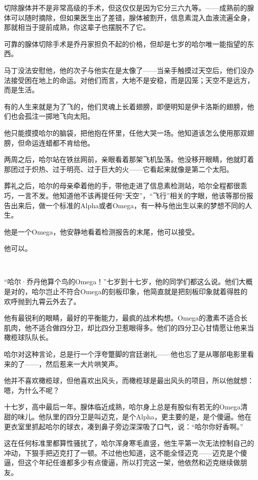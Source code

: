 \documentclass[../main]{subfiles}
\begin{document}
切除腺体并不是非常高级的手术，但这仅仅是因为它分三六九等。——成熟前的腺体可以随时摘除，但如果医生出了差错，腺体被割开，信息素混入血液流遍全身，那就相当于提前成熟，你这辈子也摆脱不了它。

可靠的腺体切除手术是乔丹家担负不起的价格，但却是七岁的哈尔唯一能指望的东西。

马丁没法安慰他，他的次子与他实在是太像了——当亲手触摸过天空后，他们没办法接受困在地上的命运。对他们而言，大地不是安稳，而是囚笼；天空不是远方，而是生活。

有的人生来就是为了飞的，他们灵魂上长着翅膀，即便明知是伊卡洛斯的翅膀，他们也会孤注一掷地飞向太阳。

他只能摸摸哈尔的脑袋，把他抱在怀里，任他大哭一场。他知道该怎么使用那双翅膀，但命运连蜡都不肯给他。

两周之后，哈尔站在铁丝网前，亲眼看着那架飞机坠落。他没移开眼睛，他就盯着那团过于炽热、过于明亮、过于巨大的火——它看起来就像是第二个太阳。

葬礼之后，哈尔的母亲牵着他的手，带他走进了信息素检测站，哈尔全程都很乖巧，一言不发。他知道他不该再提任何“天空”，“飞行”相关的字眼，他该等那份报告出来后，做一个标准的Alpha或者Omega，有一种与他出生以来的梦想不同的人生。

他是一个Omega，他安静地看着检测报告的末尾，他可以接受。

他可以。

~\

“哈尔·乔丹他算个鸟的Omega！”七岁到十七岁，他的同学们都这么说。他们大概是对的，哈尔岂止不符合Omega的刻板印象，他简直就是把刻板印象就着得胜的欢呼抛到九霄云外去了。

他有最锐利的眼睛，最好的平衡能力，最疯的战术构想。Omega的激素不适合长肌肉，他不适合做四分卫，却比四分卫惹眼得多。他们的四分卫心甘情愿让他来当橄榄球队队长。

哈尔对这种言论，总是行一个浮夸蹩脚的宫廷谢礼——他也忘了是从哪部电影里看来的了——，然后惹来一大片哄笑声。

他并不喜欢橄榄球，但他喜欢出风头，而橄榄球是最出风头的项目，所以他就想：嗯，为什么不呢？

十七岁，高中最后一年。腺体临近成熟，哈尔身上总是有股似有若无的Omega清甜的味儿。他队里的四分卫是叫迈克，是个Alpha，更主要的是，是个傻逼。他在更衣室里抓起哈尔的球衣，凑到鼻子旁边深深吸了口气，说：“哈尔你好香啊。”

这在任何标准里都算性骚扰了，哈尔浑身寒毛直竖，他生平第一次无法控制自己的冲动，下狠手把迈克打了一顿。不过他也知道，这不能全怪迈克——迈克是个傻逼，但这个年纪任谁都多少有点傻逼，所以打完这一架，他依然和迈克继续做朋友。
\end{document}

